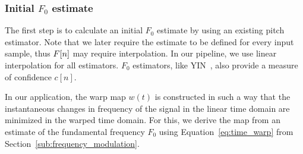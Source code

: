 \subsubsection{Initial $F_0$ estimate}
\label{ssub:initial_estimate}

The first step is to calculate an initial $F_0$ estimate by using an existing pitch estimator. Note that we later require the estimate to be defined for every input sample, thus ${F}[n]$ may require interpolation. In our pipeline, we use linear interpolation for all estimators. $F_0$ estimators, like YIN~\cite{decheveigne02}, also provide a measure of confidence $c[n]$.
\par
In our application, the warp map $w(t)$ is constructed in such a way that the instantaneous changes in frequency of the signal in the linear time domain are minimized in the warped time domain. For this, we derive the map from an estimate of the fundamental frequency $F_0$ using Equation~\ref{eq:time_warp} from Section~\ref{sub:frequency_modulation}.

